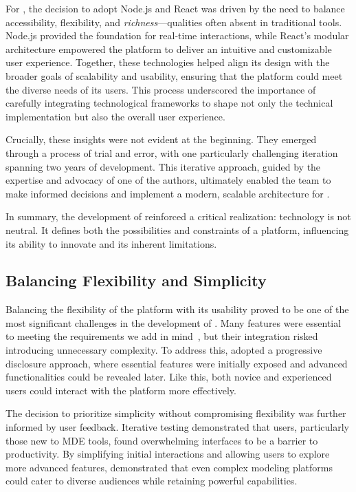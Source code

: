 For \jjodel{}, the decision to adopt Node.js and React was driven by the need to balance accessibility, flexibility, and \textit{richness}—qualities often absent in traditional tools. Node.js provided the foundation for real-time interactions, while React’s modular architecture empowered the platform to deliver an intuitive and customizable user experience. Together, these technologies helped \jjodel{} align its design with the broader goals of scalability and usability, ensuring that the platform could meet the diverse needs of its users. This process underscored the importance of carefully integrating technological frameworks to shape not only the technical implementation but also the overall user experience.

Crucially, these insights were not evident at the beginning. They emerged through a process of trial and error, with one particularly challenging iteration spanning two years of development. This iterative approach, guided by the expertise and advocacy of one of the authors, ultimately enabled the team to make informed decisions and implement a modern, scalable architecture for \jjodel{}.

In summary, the development of \jjodel{} reinforced a critical realization: technology is not neutral. It defines both the possibilities and constraints of a platform, influencing its ability to innovate and its inherent limitations. 

\subsection{Balancing Flexibility and Simplicity}
Balancing the flexibility of the platform with its usability proved to be one of the most significant challenges in the development of \jjodel{}. Many features were essential to meeting the requirements we add in mind~\cite{di2023jjodel}, but their integration risked introducing unnecessary complexity. To address this, \jjodel{} adopted a progressive disclosure approach, where essential features were initially exposed and advanced functionalities could be revealed later. Like this, both novice and experienced users could interact with the platform more effectively.

The decision to prioritize simplicity without compromising flexibility was further informed by user feedback. Iterative testing demonstrated that users, particularly those new to MDE tools, found overwhelming interfaces to be a barrier to productivity. By simplifying initial interactions and allowing users to explore more advanced features, \jjodel{} demonstrated that even complex modeling platforms could cater to diverse audiences while retaining powerful capabilities. 

